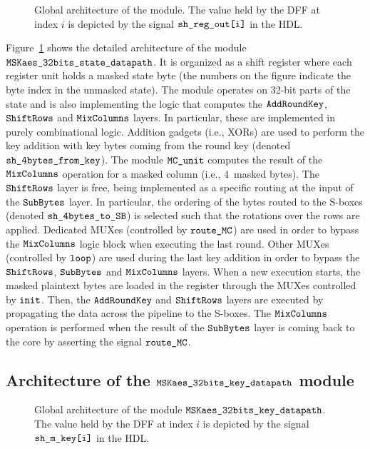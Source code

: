 \documentclass{scrartcl}
\begin{document}
\begin{figure}
    \centering
    \resizebox{\textwidth}{!}{
        \begin{tikzpicture}
            
        \end{tikzpicture}
    }
    \caption{Global architecture of the \modAESdpState module. The value held by the DFF at index $i$ is depicted by the signal $\texttt{sh\_reg\_out[i]}$ in the HDL.}
    \label{fig:aes_dpState}
\end{figure}

Figure~\ref{fig:aes_dpState} shows the detailed architecture of the
module $\texttt{MSKaes\_32bits\_state\_datapath}$. It is organized as a shift register where each
register unit holds a masked state byte (the numbers on the figure
indicate the byte index in the unmasked state).
The module operates on 32-bit parts of the state and is also implementing the
logic that computes the $\texttt{AddRoundKey}$, $\texttt{ShiftRows}$ and $\texttt{MixColumns}$ layers.
In particular, these are implemented in purely
combinational logic.
Addition gadgets (i.e., XORs) are used to perform the key addition with key
bytes coming from the round
key (denoted $\texttt{sh\_4bytes\_from\_key}$).
The module $\texttt{MC\_unit}$ computes the
result of the $\texttt{MixColumns}$ operation for a masked column (i.e., 4~masked bytes). The
$\texttt{ShiftRows}$ layer is free, being implemented as a specific
routing at the input of the $\texttt{SubBytes}$ layer.
In particular, the ordering of the bytes routed to the
S-boxes (denoted $\texttt{sh\_4bytes\_to\_SB}$) is selected such that the rotations over
the rows are applied. Dedicated MUXes (controlled by $\texttt{route\_MC}$) are
used in order to bypass the $\texttt{MixColumns}$ logic block when executing the last round.
Other MUXes (controlled by $\texttt{loop}$) are used during the
last key addition in order to bypass the $\texttt{ShiftRows}$, $\texttt{SubBytes}$ and $\texttt{MixColumns}$ layers.
When a new execution starts, the masked plaintext bytes are loaded in the register through the 
MUXes controlled by $\texttt{init}$.
Then, the $\texttt{AddRoundKey}$ and $\texttt{ShiftRows}$ layers are executed by propagating the data 
across the pipeline to the S-boxes.
The $\texttt{MixColumns}$ operation is performed when the result of the $\texttt{SubBytes}$ layer is coming back to the 
core by asserting the signal $\texttt{route\_MC}$. 

\subsection{Architecture of the $\texttt{MSKaes\_32bits\_key\_datapath}$ module}

\begin{figure}
    \centering
    \resizebox{\textwidth}{!}{
        \begin{tikzpicture}
            
        \end{tikzpicture}
    }
    \caption{Global architecture of the module $\texttt{MSKaes\_32bits\_key\_datapath}$. The value held by the DFF at index $i$ is depicted by the signal $\texttt{sh\_m\_key[i]}$ in the HDL.}
    \label{fig:aes_dpKey}
\end{figure}
\end{document}

